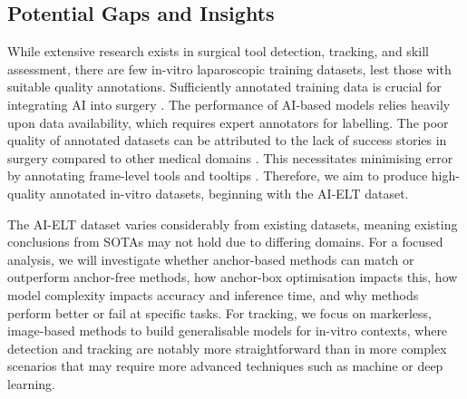 

\subsection{Potential Gaps and Insights}

While extensive research exists in surgical tool detection, tracking, and skill assessment, there are few in-vitro laparoscopic training datasets, lest those with suitable quality annotations. Sufficiently annotated training data is crucial for integrating AI into surgery \cite{ali2023comprehensivesurveyrecentdeep}. The performance of AI-based models relies heavily upon data availability, which requires expert annotators for labelling. The poor quality of annotated datasets can be attributed to the lack of success stories in surgery compared to other medical domains \cite{maier-hein_surgical_2022}. This necessitates minimising error by annotating frame-level tools and tooltips \cite{teevno_semi-supervised_2023}. Therefore, we aim to produce high-quality annotated in-vitro datasets, beginning with the AI-ELT dataset. 

The AI-ELT dataset varies considerably from existing datasets, meaning existing conclusions from SOTAs may not hold due to differing domains. For a focused analysis, we will investigate whether anchor-based methods can match or outperform anchor-free methods, how anchor-box optimisation impacts this, how model complexity impacts accuracy and inference time, and why methods perform better or fail at specific tasks. For tracking, we focus on markerless, image-based methods to build generalisable models for in-vitro contexts, where detection and tracking are notably more straightforward than in more complex scenarios that may require more advanced techniques such as machine or deep learning.


